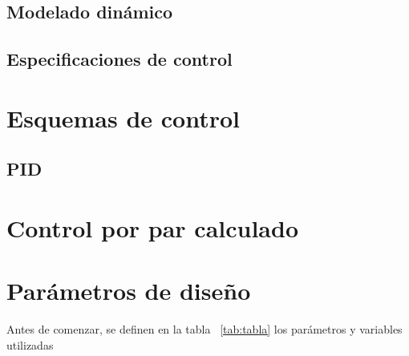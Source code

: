 \subsection{Modelado dinámico}


\subsection{Especificaciones de control}



\section{Esquemas de control}

\subsection{PID}

\section{Control por par calculado}

\section{Parámetros de diseño}
Antes de comenzar, se definen  en la tabla ~\ref{tab:tabla} los parámetros y variables utilizadas

